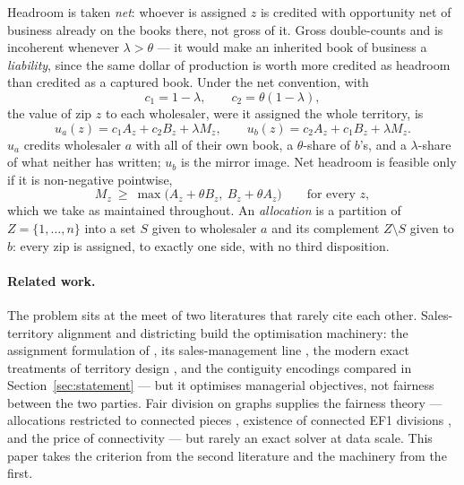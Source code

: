 \documentclass[11pt]{article}
\theoremstyle{remark}\newtheorem*{remark}{Remark}
\begin{document}
Headroom is taken \emph{net}: whoever is assigned $z$ is credited with opportunity net of
business already on the books there, not gross of it. Gross double-counts and is
incoherent whenever $\lambda>\theta$ --- it would make an inherited book of business a
\emph{liability}, since the same dollar of production is worth more credited as headroom
than credited as a captured book. Under the net convention, with
\begin{equation}\label{eq:coefs}
c_1=1-\lambda,\qquad c_2=\theta(1-\lambda),
\end{equation}
the value of zip $z$ to each wholesaler, were it assigned the whole territory, is
\begin{equation}\label{eq:util}
u_a(z)=c_1A_z+c_2B_z+\lambda M_z,\qquad u_b(z)=c_2A_z+c_1B_z+\lambda M_z .
\end{equation}
$u_a$ credits wholesaler $a$ with all of their own book, a $\theta$-share of $b$'s, and a
$\lambda$-share of what neither has written; $u_b$ is the mirror image. Net headroom is
feasible only if it is non-negative pointwise,
\begin{equation}\label{eq:headroom}
M_z\ \ge\ \max\bigl(A_z+\theta B_z,\ B_z+\theta A_z\bigr)\qquad\text{for every }z,
\end{equation}
which we take as maintained throughout. An \emph{allocation} is a partition of
$Z=\{1,\dots,n\}$ into a set $S$ given to wholesaler $a$ and its complement
$Z\setminus S$ given to $b$: every zip is assigned, to exactly one side, with no third
disposition.

\paragraph{Related work.} The problem sits at the meet of two literatures that rarely
cite each other. Sales-territory alignment and districting build the optimisation
machinery: the assignment formulation of \citet{hess1971}, its sales-management line
\citep{zoltners1983,zoltners2000,zoltners2005}, the modern exact treatments of
territory design \citep{salazaraguilar2011,rosmercado2012}, and the contiguity
encodings compared in Section~\ref{sec:statement} --- but it optimises managerial
objectives, not fairness between the two parties. Fair division on graphs supplies the
fairness theory --- allocations restricted to connected pieces \citep{bouveret2017},
existence of connected EF1 divisions \citep{bilo2022,suksompong2019}, and the price of
connectivity \citep{bei2022} --- but rarely an exact solver at data scale. This paper
takes the criterion from the second literature and the machinery from the first.
\end{document}
